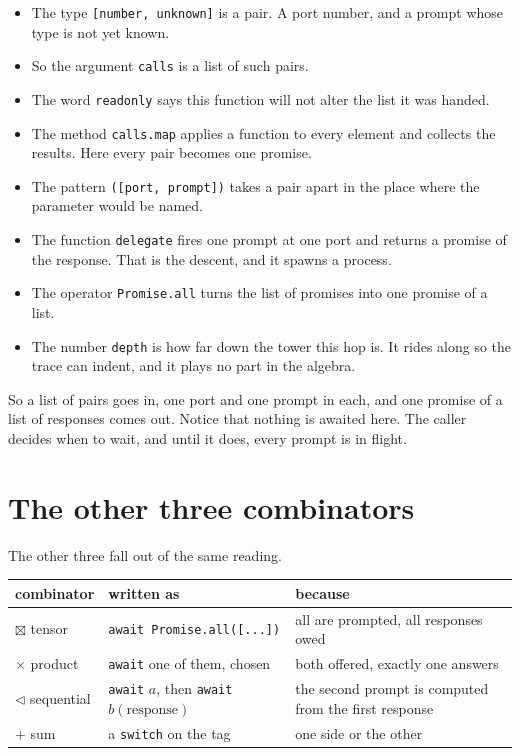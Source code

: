 \documentclass[11pt,a4paper]{article}
\begin{document}
\begin{itemize}\setlength{\itemsep}{2pt}
\item The type \texttt{[number, unknown]} is a pair. A port number, and a prompt whose type is not
      yet known.
\item So the argument \texttt{calls} is a list of such pairs.
\item The word \texttt{readonly} says this function will not alter the list it was handed.
\item The method \texttt{calls.map} applies a function to every element and collects the results.
      Here every pair becomes one promise.
\item The pattern \texttt{([port, prompt])} takes a pair apart in the place where the parameter
      would be named.
\item The function \texttt{delegate} fires one prompt at one port and returns a promise of the
      response. That is the descent, and it spawns a process.
\item The operator \texttt{Promise.all} turns the list of promises into one promise of a list.
\item The number \texttt{depth} is how far down the tower this hop is. It rides along so the trace
      can indent, and it plays no part in the algebra.
\end{itemize}

So a list of pairs goes in, one port and one prompt in each, and one promise of a list of responses
comes out. Notice that nothing is
awaited here. The caller decides when to wait, and until it does, every prompt is in flight.

\newpage

\section{The other three combinators}
\label{sec:otherthree}

The other three fall out of the same reading.

\begin{center}\small
\begin{tabular}{@{}lll@{}}
\toprule
\textbf{combinator} & \textbf{written as} & \textbf{because} \\
\midrule
$\boxtimes$ tensor      & \texttt{await Promise.all([...])} & all are prompted, all responses owed \\
$\times$ product        & \texttt{await} one of them, chosen & both offered, exactly one answers \\
$\lhd$ sequential       & \texttt{await} $a$, then \texttt{await} $b(\text{response})$
                        & the second prompt is computed from the first response \\
$+$ sum                 & a \texttt{switch} on the tag & one side or the other \\
\bottomrule
\end{tabular}
\end{center}
\end{document}
